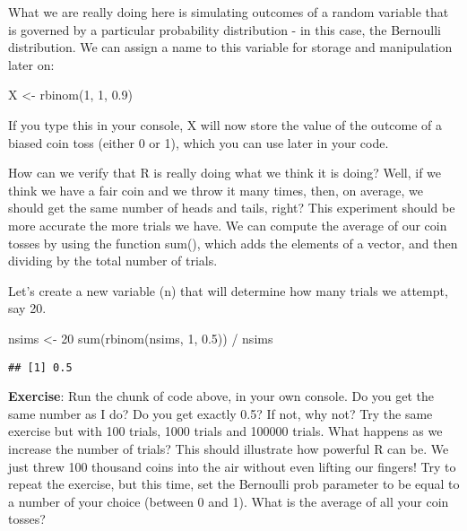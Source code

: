 \documentclass[
]{book}
\newenvironment{Shaded}{\begin{snugshade}}{\end{snugshade}}
\newcommand{\DecValTok}[1]{\textcolor[rgb]{0.00,0.00,0.81}{#1}}
\newcommand{\FloatTok}[1]{\textcolor[rgb]{0.00,0.00,0.81}{#1}}
\newcommand{\FunctionTok}[1]{\textcolor[rgb]{0.00,0.00,0.00}{#1}}
\newcommand{\NormalTok}[1]{#1}
\newcommand{\OtherTok}[1]{\textcolor[rgb]{0.56,0.35,0.01}{#1}}
\newcommand{\SpecialCharTok}[1]{\textcolor[rgb]{0.00,0.00,0.00}{#1}}
\begin{document}
What we are really doing here is simulating outcomes of a random variable that is governed by a particular probability distribution - in this case, the Bernoulli distribution. We can assign a name to this variable for storage and manipulation later on:

\begin{Shaded}
\begin{Highlighting}[]
\NormalTok{X }\OtherTok{\textless{}{-}} \FunctionTok{rbinom}\NormalTok{(}\DecValTok{1}\NormalTok{, }\DecValTok{1}\NormalTok{, }\FloatTok{0.9}\NormalTok{)}
\end{Highlighting}
\end{Shaded}

If you type this in your console, X will now store the value of the outcome of a biased coin toss (either 0 or 1), which you can use later in your code.

How can we verify that R is really doing what we think it is doing? Well, if we think we have a fair coin and we throw it many times, then, on average, we should get the same number of heads and tails, right? This experiment should be more accurate the more trials we have. We can compute the average of our coin tosses by using the function sum(), which adds the elements of a vector, and then dividing by the total number of trials.

Let's create a new variable (n) that will determine how many trials we attempt, say 20.

\begin{Shaded}
\begin{Highlighting}[]
\NormalTok{nsims }\OtherTok{\textless{}{-}} \DecValTok{20}
\FunctionTok{sum}\NormalTok{(}\FunctionTok{rbinom}\NormalTok{(nsims, }\DecValTok{1}\NormalTok{, }\FloatTok{0.5}\NormalTok{)) }\SpecialCharTok{/}\NormalTok{ nsims}
\end{Highlighting}
\end{Shaded}

\begin{verbatim}
## [1] 0.5
\end{verbatim}

\textbf{Exercise}: Run the chunk of code above, in your own console. Do you get the same number as I do? Do you get exactly 0.5? If not, why not? Try the same exercise but with 100 trials, 1000 trials and 100000 trials. What happens as we increase the number of trials? This should illustrate how powerful R can be. We just threw 100 thousand coins into the air without even lifting our fingers! Try to repeat the exercise, but this time, set the Bernoulli prob parameter to be equal to a number of your choice (between 0 and 1). What is the average of all your coin tosses?
\end{document}
